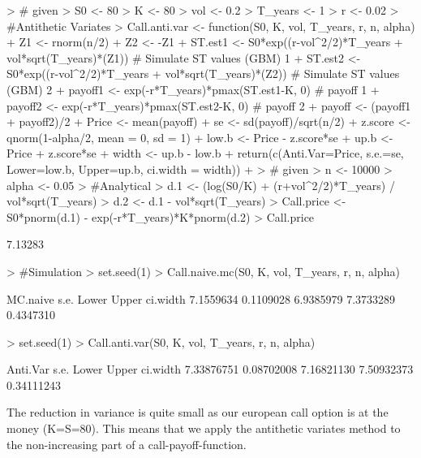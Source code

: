 \documentclass{article}
\begin{document}
\begin{Schunk}
\begin{Sinput}
> # given
> S0 <- 80
> K <- 80
> vol <- 0.2
> T_years <- 1
> r <- 0.02
> #Antithetic Variates
> Call.anti.var <- function(S0, K, vol, T_years, r, n, alpha){
+   Z1 <- rnorm(n/2)
+   Z2 <- -Z1
+   ST.est1 <- S0*exp((r-vol^2/2)*T_years + vol*sqrt(T_years)*(Z1)) # Simulate ST values (GBM) 1
+   ST.est2 <- S0*exp((r-vol^2/2)*T_years + vol*sqrt(T_years)*(Z2)) # Simulate ST values (GBM) 2
+   payoff1 <- exp(-r*T_years)*pmax(ST.est1-K, 0) # payoff 1
+   payoff2 <- exp(-r*T_years)*pmax(ST.est2-K, 0) # payoff 2
+   payoff <- (payoff1 + payoff2)/2
+   Price <- mean(payoff) 
+   se <- sd(payoff)/sqrt(n/2)
+   z.score <- qnorm(1-alpha/2, mean = 0, sd = 1)
+   low.b <- Price - z.score*se
+   up.b <- Price + z.score*se
+   width <- up.b - low.b
+   return(c(Anti.Var=Price, s.e.=se, Lower=low.b, Upper=up.b, ci.width = width))
+ }
> # given
> n <- 10000
> alpha <- 0.05
> #Analytical
> d.1 <- (log(S0/K) + (r+vol^2/2)*T_years) / vol*sqrt(T_years)
> d.2 <- d.1 - vol*sqrt(T_years)
> Call.price <- S0*pnorm(d.1) - exp(-r*T_years)*K*pnorm(d.2)
> Call.price
\end{Sinput}
\begin{Soutput}
[1] 7.13283
\end{Soutput}
\begin{Sinput}
> #Simulation
> set.seed(1)
> Call.naive.mc(S0, K, vol, T_years, r, n, alpha)
\end{Sinput}
\begin{Soutput}
 MC.naive      s.e.     Lower     Upper  ci.width 
7.1559634 0.1109028 6.9385979 7.3733289 0.4347310 
\end{Soutput}
\begin{Sinput}
> set.seed(1)
> Call.anti.var(S0, K, vol, T_years, r, n, alpha)
\end{Sinput}
\begin{Soutput}
  Anti.Var       s.e.      Lower      Upper   ci.width 
7.33876751 0.08702008 7.16821130 7.50932373 0.34111243 
\end{Soutput}
\end{Schunk}

The reduction in variance is quite small as our european call option is at the money (K=S=80). This means that we apply the antithetic variates method to the non-increasing part of a call-payoff-function.\\
\end{document}
